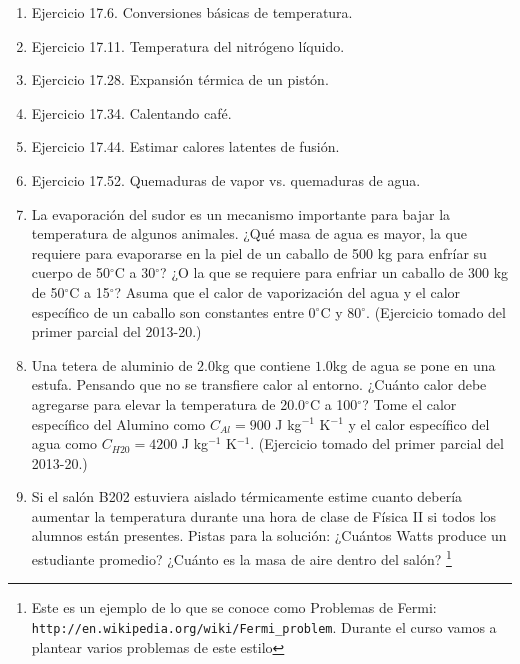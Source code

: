 \documentclass{article}
\begin{document}
\begin{enumerate}
\item{Ejercicio 17.6. Conversiones b\'asicas de temperatura.}
\item{Ejercicio 17.11. Temperatura del nitr\'ogeno l\'iquido.}
\item{Ejercicio 17.28. Expansi\'on t\'ermica de un pist\'on.} 
\item{Ejercicio 17.34. Calentando caf\'e.}
\item{Ejercicio 17.44. Estimar calores latentes de fusi\'on.}
\item{Ejercicio 17.52. Quemaduras de vapor vs. quemaduras de agua.}

\item La evaporaci\'on del sudor es un mecanismo
  importante para bajar la temperatura de algunos animales. ¿Qué masa
  de agua es mayor, la que requiere para evaporarse en la piel de un
  caballo de 500 kg para enfríar su cuerpo de  50$^{\circ}$C a
  30$^{\circ}$? ¿O la que se requiere para enfriar un caballo de 300 kg
  de 50$^{\circ}$C a 15$^{\circ}$? Asuma que el calor de
  vaporizaci\'on del agua y el calor espec\'ifico de un caballo son
  constantes entre 0$^{\circ}$C y 80$^{\circ}$. (Ejercicio tomado del primer
  parcial del 2013-20.)  

\item{Una tetera de aluminio de $2.0$kg que contiene $1.0$kg de agua se pone
en una estufa. Pensando que no se transfiere calor al entorno. ¿Cuánto
calor debe agregarse para elevar la temperatura de 20.0$^{\circ}$C a
100$^{\circ}$? Tome el calor espec\'ifico del Alumino como
$C_{Al}=900$ J kg$^{-1}$ K$^{-1}$ y el calor espec\'ifico del agua
como $C_{H20}=4200$ J kg$^{-1}$ K$^{-1}$. (Ejercicio tomado del primer parcial
del 2013-20.)}

\item{Si el sal\'on B202 estuviera aislado t\'ermicamente estime
  cuanto deber\'ia aumentar la temperatura durante una hora de clase
  de F\'isica II si todos los alumnos est\'an presentes. Pistas para
  la soluci\'on: ¿Cu\'antos
  Watts produce un estudiante promedio? ¿Cu\'anto es la masa de aire dentro
  del sal\'on? \footnote{Este es un ejemplo de lo que se conoce como
    Problemas de Fermi:
    {\texttt{http://en.wikipedia.org/wiki/Fermi\_problem}}. Durante el
    curso vamos a plantear varios problemas de este estilo}} 



\end{enumerate}
\end{document}
